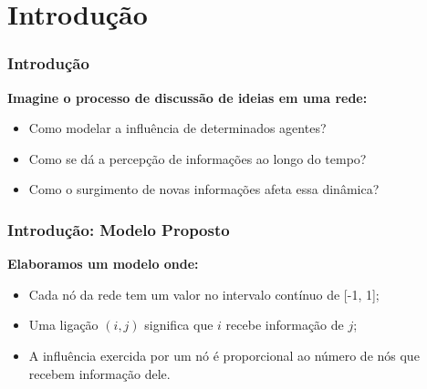 
\section{Introdução}

\begin{frame}
  \frametitle{Introdução}

  \textbf{Imagine o processo de discussão de ideias em uma rede:}

  \begin{alertblock}{}
    \vspace{5mm}

    \begin{itemize}
      \item Como modelar a influência de determinados agentes?
      \item Como se dá a percepção de informações ao longo do tempo?
      \item Como o surgimento de novas informações afeta essa dinâmica?
    \end{itemize}
    \vspace{5mm}

  \end{alertblock}
\end{frame}

\begin{frame}
  \frametitle{Introdução: Modelo Proposto}

  \textbf{Elaboramos um modelo onde:}

  \begin{alertblock}{}
    \vspace{5mm}

    \begin{itemize}
      \item Cada nó da rede tem um valor no intervalo contínuo de [-1, 1];
      \item Uma ligação $(i, j)$ significa que $i$ recebe informação de $j$;
      \vspace{5mm}

      \item A influência exercida por um nó é proporcional ao número de nós que
        recebem informação dele.
    \end{itemize}
    \vspace{5mm}

  \end{alertblock}
\end{frame}

